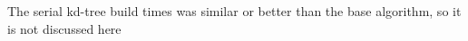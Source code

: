 




The serial kd-tree build times was similar or better than the base algorithm, so it is not discussed here



